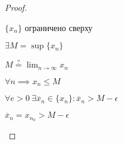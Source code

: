 \begin{proof}
    \begin{enum}
    \item
        $\{x_n\}$ ограничено сверху

        $\exists M = \sup \{x_n\}$

        $M \overset{?}{=} \lim_{n \to \infty} x_n$

        $\forall n \implies x_n \leq M$

        $\forall e > 0 \ \exists \overline{x}_n \in \{x_n\} : \overline{x}_n > M - \epsilon$
        
        $\overline{x}_n = x_{n_0} > M - \epsilon$
    \end{enum}
\end{proof}

